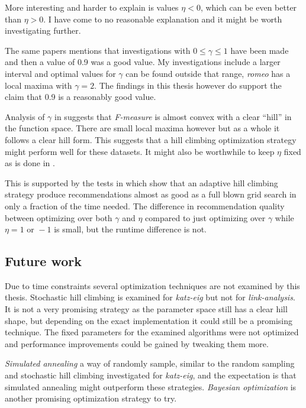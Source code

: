 More interesting and harder to explain is values $\eta < 0$, which can be even better than $\eta > 0$. I have come to no reasonable explanation and it might be worth investigating further.

The same papers \cite{huang2004link, huang2007comparison} mentions that investigations with $0 \leq \gamma \leq 1$ have been made and then a value of 0.9 was a good value. My investigations include a larger interval and optimal values for $\gamma$ can be found outside that range, \textit{romeo} has a local maxima with $\gamma = 2$. The findings in this thesis however do support the claim that 0.9 is a reasonably good value.

Analysis of $\gamma$ in  suggests that \textit{F-measure} is almost convex with a clear ``hill'' in the function space. There are small local maxima however but as a whole it follows a clear hill form. This suggests that a hill climbing optimization strategy might perform well for these datasets. It might also be worthwhile to keep $\eta$ fixed as is done in \cite{huang2004link, huang2007comparison}.

This is supported by the tests in  which show that an adaptive hill climbing strategy produce recommendations almost as good as a full blown grid search in only a fraction of the time needed. The difference in recommendation quality between optimizing over both $\gamma$ and $\eta$ compared to just optimizing over $\gamma$ while $\eta = 1 \text{ or } -1$ is small, but the runtime difference is not.

\subsection{Future work}

Due to time constraints several optimization techniques are not examined by this thesis. Stochastic hill climbing is examined for \textit{katz-eig} but not for \textit{link-analysis}. It is not a very promising strategy as the parameter space still has a clear hill shape, but depending on the exact implementation it could still be a promising technique. The fixed parameters for the examined algorithms were not optimized and performance improvements could be gained by tweaking them more.

\textit{Simulated annealing} a way of randomly sample, similar to the random sampling and stochastic hill climbing investigated for \textit{katz-eig}, and the expectation is that simulated annealing might outperform these strategies. \textit{Bayesian optimization} is another promising optimization strategy to try.

